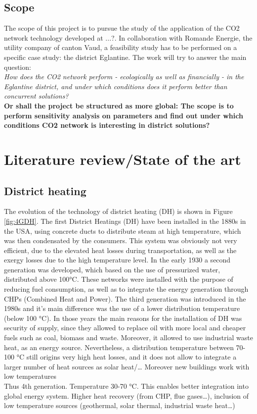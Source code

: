 \documentclass{article}
\begin{document}
\subsection{Scope}
The scope of this project is to pursue the study of the application of the CO2 network technology developed at ...?. In collaboration with Romande Energie, the utility company of canton Vaud, a feasibility study has to be performed on a specific case study: the district Eglantine. The work will try to answer the main question:\\
\textit{How does the CO2 network perform - ecologically as well as financially - in the Eglantine district, and under which conditions does it perform better than concurrent solutions?}\\

\textbf{Or shall the project be structured as more global: The scope is to perform sensitivity analysis on parameters and find out under which conditions CO2 network is interesting in district solutions?}


\section{Literature review/State of the art}

\subsection{District heating}
The evolution of the technology of district heating (DH) is shown in Figure \ref{fig:4GDH}.
The first District Heatings (DH) have been installed in the 1880s in the USA, using concrete ducts to distribute steam at high temperature, which was then condensated by the consumers. This system was obviously not very efficient, due to the elevated heat losses during transportation, as well as the exergy losses due to the high temperature level. In the early 1930 a second generation was developed, which based on the use of pressurized water, distributed above 100\si{\celsius}. These networks were installed with the purpose of reducing fuel consumption, as well as to integrate the energy generation through CHPs (Combined Heat and Power). The third generation was introduced in the 1980s and it's main difference was the use of a lower distribution temperature (below 100 \si{\celsius}). In those years the main reasons for the installation of DH was security of supply, since they allowed to replace oil with more local and cheaper fuels such as coal, biomass and waste. Moreover, it allowed to use industrial waste heat, as an energy source. 
Nevertheless, a distribution temperature between 70-100 \si{\celsius} still origins very high heat losses, and it does not allow to integrate a larger number of heat sources as solar heat/…
Moreover new buildings work with low temperatures\\
Thus 4th generation. Temperature 30-70 \si{\celsius}.
This enables better integration into global energy system. Higher heat recovery (from CHP, flue gases…), inclusion of low temperature sources (geothermal, solar thermal, industrial waste heat…)
\end{document}

